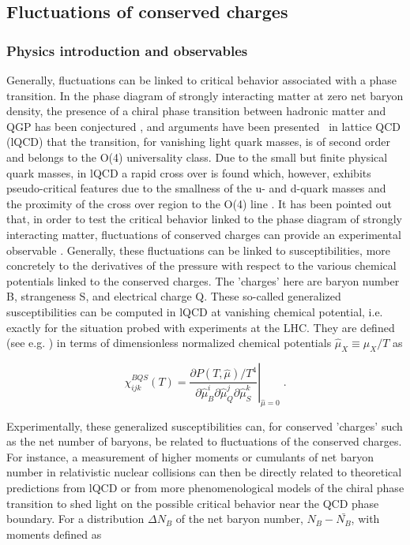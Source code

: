 \subsection{Fluctuations of conserved charges} 
\subsubsection{Physics introduction and observables}

Generally, fluctuations can be linked to critical behavior associated with a phase transition. In the phase diagram of strongly interacting matter at zero net baryon density, the presence of a chiral phase transition between hadronic matter and QGP has been conjectured \cite{Pisarski:1983ms}, and arguments have been presented~\cite{Ejiri:2009ac,Ding:2018auz} in lattice QCD (lQCD) that the transition, for vanishing light quark masses, is of second order and belongs to the O(4) universality class. Due to the small but finite physical quark masses, in lQCD a rapid cross over is found \cite{Aoki:2006we,Aoki:2009sc,Borsanyi:2010bp,Bazavov:2011nk,Bhattacharya:2014ara}   which, however, exhibits pseudo-critical features due to the smallness of the u- and d-quark masses and the proximity of the cross over region to the O(4) line \cite{Ejiri:2009ac,Ding:2013lfa}. It has been pointed out that, in order to test the critical behavior linked to the phase diagram of strongly interacting matter, fluctuations of conserved charges can provide an experimental observable \cite{Ejiri:2005wq,Bazavov:2017dus,Friman:2011pf,Bazavov:2012jq}. Generally, these fluctuations can be linked to susceptibilities, more concretely to the derivatives of the pressure with respect to the various chemical potentials linked to the conserved charges. The 'charges' here are baryon number B, strangeness S, and electrical charge Q. These so-called generalized susceptibilities can be computed in lQCD at vanishing chemical potential, i.e. exactly for the situation probed with experiments at the LHC. They are defined (see e.g. \cite{Bazavov:2012jq,Bellwied:2015lba}) in terms of dimensionless normalized chemical potentials \(\hat{\mu}_X\equiv \mu_X/T \) \: as

\begin{equation}
\chi_{ijk}^{BQS}(T) = \left.
\frac{\partial P(T,\hat{\mu})/T^4}{\partial\hat{\mu}_B^i \partial\hat{\mu}_Q^j \partial\hat{\mu}_S^k}\right|_{\hat{\mu}=0} \; .
\label{suscept}
\end{equation} 

\noindent Experimentally, these generalized susceptibilities can, for conserved 'charges' such as the net number of baryons, be related to fluctuations of the conserved charges. For instance, a measurement of higher moments or cumulants of net baryon number in relativistic nuclear collisions can then be directly related \cite{Karsch:2010ck,Skokov:2012ds,Karsch:2012wm,Karsch:2017mvg,Borsanyi:2013hza,Borsanyi:2014ewa} to theoretical predictions from lQCD or from more phenomenological models  of the chiral phase transition  \cite{Almasi:2017bhq,Parotto:2018pwx}  to shed light on the possible critical behavior near the QCD phase boundary. For a distribution $\Delta N_B$ of the net baryon number, $N_B - \bar{N_B}$, with moments defined as 

